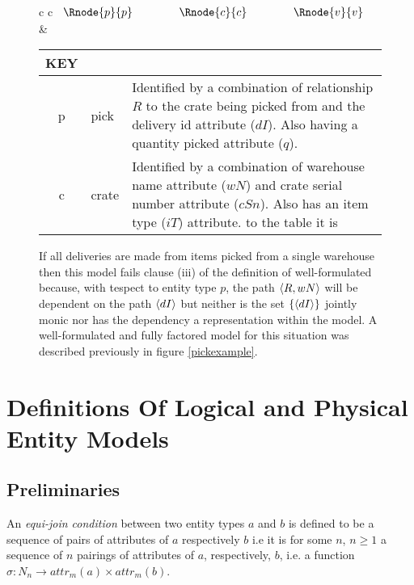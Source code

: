 \documentclass[10pt,a4paper]{article}
\newcommand{\genericmodel}{\mathcal{M}}
\renewcommand{\genericmodel}{{m}}
\newcommand{\attr}[2] [\genericmodel]{attr_{#1}(#2)}
\newcommand{\term}[1]{\textit{{#1}}}
\begin{document}
\begin{figure} [H]
\begin{center}
\begin{tabular}{c c}
$
\begin{array}{cp{0.75cm}cp{0.75cm}c}
   \Rnode{p}{p}     & & \Rnode{c}{c} & & \Rnode{v}{v}    
\end{array}
$
\idcomp
{} 
\idcomp
{} 
\idcomp
{}
\idcomp
{}
& \footnotesize
\begin{tabular}{c p{1.5cm} p{4cm}}
KEY && \\
\hline
p & pick & Identified by a combination of relationship $R$ to the crate being picked from
                and the delivery id attribute ($dI$). Also  having a quantity picked 
								attribute ($q$).\\
c & crate & Identified by a combination of warehouse name attribute ($wN$)
              and crate serial number attribute ($cSn$). Also has an item type ($iT$) attribute.
 to the table it is 
\end{tabular} 
\end{tabular}
\end{center}
\caption{If all deliveries are made from items picked from a single warehouse 
then this model fails clause (iii) of the definition of well-formulated because, with tespect to entity type $p$, the path $\langle R,wN\rangle$ will be dependent on the path $\langle dI\rangle$ but neither is the set 
$\{\langle dI\rangle\}$ jointly monic nor has the dependency a representation within the model. A well-formulated and fully factored model for this situation was described previously in 
figure \ref{pickexample}.
}
\label{pickexamplebeforenormalisation}
\end{figure}

\section{Definitions Of Logical and Physical Entity Models}
\subsection{Preliminaries}
\begin{definition}
\noindent An \term{equi-join condition} between two entity types $a$ and $b$ is defined to be a sequence of pairs of attributes of 
 $a$ respectively $b$ i.e it is for some $n$, $n \geq 1$ a sequence of $n$ pairings of attributes of $a$, respectively, $b$, i.e. a function $\sigma: N_n \rightarrow \attr{a} \times \attr{b}$. \\
\end{definition}
\end{document}
